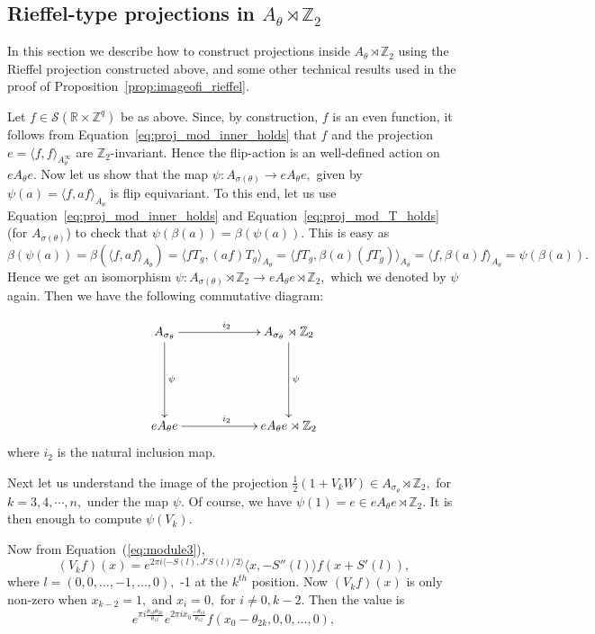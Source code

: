 \documentclass[9pt, BCOR=2mm]{amsart}
\numberwithin{equation}{section}
\numberwithin{equation}{section}
\newcommand{\Z}{{\mathbb{Z}}}
\begin{document}
\subsection{Rieffel-type projections in $A_{\theta}\rtimes \Z_2$}\label{sec:bottpincrossed} 
In this section we describe how to construct projections inside $A_{\theta}\rtimes \Z_2$ using the Rieffel projection constructed above, 
and some other technical results used in the proof of Proposition~\ref{prop:imageofi_rieffel}.

Let $f \in \mathcal{S}\left(\mathbb{R} \times \mathbb{Z}^q\right)$ be as above. Since, by construction, $f$ is an even function, it follows from Equation~\ref{eq:proj_mod_inner_holds} that $f$ and the projection $e=\langle f, f\rangle_{A_\theta^{\infty}}$ are $\mathbb{Z}_2$-invariant. Hence the flip-action is an well-defined action on $eA_\theta e.$ Now let us show that the map $\psi: A_{\sigma(\theta)} \rightarrow eA_{\theta}e,$ given by $\psi(a)= \langle f,af\rangle _{A_{\theta}}$ is flip equivariant. To this end, let us use Equation~\ref{eq:proj_mod_inner_holds} and Equation~\ref{eq:proj_mod_T_holds} (for $A_{\sigma(\theta)}$) to check that $\psi(\beta(a))=\beta(\psi(a)).$ This is easy as $\beta(\psi(a))= \beta(\langle f,af\rangle _{A_{\theta}})=\langle fT_g,(af)T_g\rangle _{A_{\theta}}=\langle fT_g,\beta(a)(fT_g)\rangle _{A_{\theta}}=\langle f,\beta(a)f\rangle _{A_{\theta}}=\psi(\beta(a)).$
Hence we get an isomorphism $\psi: A_{\sigma(\theta)}\rtimes \Z_2 \rightarrow eA_{\theta}e\rtimes \Z_2,$ which we denoted by $\psi$ again. Then we have the following commutative diagram:

	
	\begin{align}\label{diag:i*_commutes}
\xymatrixrowsep{5pc}
\xymatrixcolsep{5pc}
\xymatrix
{
A_{\sigma_\theta} \ar[r]^{i_2} \ar[d]^{\psi} &
A_{\sigma_\theta}\rtimes\Z_2 \ar[d]^{\psi} \\
e A_{\theta}e \ar[r]^{i_2} &
eA_{\theta}e\rtimes \Z_2
}
\end{align}
where $i_2$ is the natural inclusion map. 


Next let us understand the image of the projection $\frac{1}{2}(1+V_kW)\in A_{\sigma_\theta}\rtimes\Z_2,$ for $k=3,4,\cdots,n,$ under the map $\psi.$ Of course, we have $\psi(1)=e \in eA_{\theta}e\rtimes \Z_2$. It is then enough to compute $\psi(V_k).$ 

Now from Equation~(\ref{eq:module3}), 
  $$(V_kf)(x)=e^{2\pi i\langle -S(l),J'S(l)\slash2\rangle}\langle x,-S''(l)\rangle f(x+S'(l)),$$ where $l=(0,0, \ldots, -1,\ldots, 0),$ -1 at the $k^{th}$ position. Now $(V_kf)(x)$ is only non-zero when $x_{k-2}=1,$ and $x_i=0,$ for $i\neq 0, k-2.$ Then the value is 
  $$e^{\pi i\frac{\theta_{1k}\theta_{2k}}{\theta_{12}}}e^{2\pi ix_0\frac{-\theta_{1k}}{\theta_{12}}} f(x_0-\theta_{2k},0,0,\ldots,0),$$
  
\end{document}

